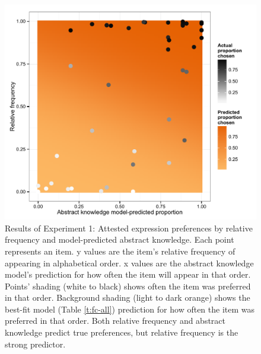 \documentclass[authoryear]{elsarticle}
\begin{document}
\begin{figure}[t]
\includegraphics[scale=0.7]{fc-attested.pdf}

\caption{Results of Experiment 1: Attested expression preferences by relative frequency and model-predicted abstract knowledge. Each point represents an item. y values are the item's relative frequency of appearing in alphabetical order. x values are the abstract knowledge model's prediction for how often the item will appear in that order. Points' shading (white to black) shows often the item was preferred in that order. Background shading (light to dark orange) shows the best-fit model (Table \ref{t:fc-all}) prediction for how often the item was preferred in that order. Both relative frequency and abstract knowledge predict true preferences, but relative frequency is the strong predictor.} 
\label{fig:fc-freq}
\end{figure}

\end{document}
